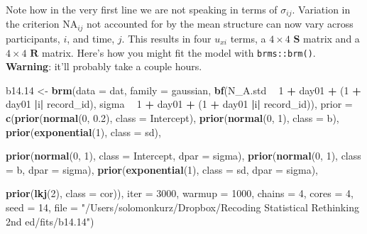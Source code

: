 \documentclass[]{article}
\newenvironment{Shaded}{\begin{snugshade}}{\end{snugshade}}
\newcommand{\DataTypeTok}[1]{\textcolor[rgb]{0.13,0.29,0.53}{#1}}
\newcommand{\DecValTok}[1]{\textcolor[rgb]{0.00,0.00,0.81}{#1}}
\newcommand{\FloatTok}[1]{\textcolor[rgb]{0.00,0.00,0.81}{#1}}
\newcommand{\KeywordTok}[1]{\textcolor[rgb]{0.13,0.29,0.53}{\textbf{#1}}}
\newcommand{\NormalTok}[1]{#1}
\newcommand{\OperatorTok}[1]{\textcolor[rgb]{0.81,0.36,0.00}{\textbf{#1}}}
\newcommand{\StringTok}[1]{\textcolor[rgb]{0.31,0.60,0.02}{#1}}
\begin{document}
Note how in the very first line we are not speaking in terms of
\(\sigma_{ij}\). Variation in the criterion \(\text{NA}_{ij}\) not
accounted for by the mean structure can now vary across participants,
\(i\), and time, \(j\). This results in four \(u_{xi}\) terms, a
\(4 \times 4\) \(\mathbf S\) matrix and a \(4 \times 4\) \(\mathbf R\)
matrix. Here's how you might fit the model with \texttt{brms::brm()}.
\textbf{Warning}: it'll probably take a couple hours.

\begin{Shaded}
\begin{Highlighting}[]
\NormalTok{b14}\FloatTok{.14}\NormalTok{ <-}
\StringTok{  }\KeywordTok{brm}\NormalTok{(}\DataTypeTok{data =}\NormalTok{ dat,}
      \DataTypeTok{family =}\NormalTok{ gaussian,}
      \KeywordTok{bf}\NormalTok{(N_A.std }\OperatorTok{~}\StringTok{ }\DecValTok{1} \OperatorTok{+}\StringTok{ }\NormalTok{day01 }\OperatorTok{+}\StringTok{ }\NormalTok{(}\DecValTok{1} \OperatorTok{+}\StringTok{ }\NormalTok{day01 }\OperatorTok{|}\NormalTok{i}\OperatorTok{|}\StringTok{ }\NormalTok{record_id),}
\NormalTok{         sigma }\OperatorTok{~}\StringTok{ }\DecValTok{1} \OperatorTok{+}\StringTok{ }\NormalTok{day01 }\OperatorTok{+}\StringTok{ }\NormalTok{(}\DecValTok{1} \OperatorTok{+}\StringTok{ }\NormalTok{day01 }\OperatorTok{|}\NormalTok{i}\OperatorTok{|}\StringTok{ }\NormalTok{record_id)),}
      \DataTypeTok{prior =} \KeywordTok{c}\NormalTok{(}\KeywordTok{prior}\NormalTok{(}\KeywordTok{normal}\NormalTok{(}\DecValTok{0}\NormalTok{, }\FloatTok{0.2}\NormalTok{), }\DataTypeTok{class =}\NormalTok{ Intercept),}
                \KeywordTok{prior}\NormalTok{(}\KeywordTok{normal}\NormalTok{(}\DecValTok{0}\NormalTok{, }\DecValTok{1}\NormalTok{), }\DataTypeTok{class =}\NormalTok{ b),}
                \KeywordTok{prior}\NormalTok{(}\KeywordTok{exponential}\NormalTok{(}\DecValTok{1}\NormalTok{), }\DataTypeTok{class =}\NormalTok{ sd),}
                
                \KeywordTok{prior}\NormalTok{(}\KeywordTok{normal}\NormalTok{(}\DecValTok{0}\NormalTok{, }\DecValTok{1}\NormalTok{), }\DataTypeTok{class =}\NormalTok{ Intercept, }\DataTypeTok{dpar =}\NormalTok{ sigma),}
                \KeywordTok{prior}\NormalTok{(}\KeywordTok{normal}\NormalTok{(}\DecValTok{0}\NormalTok{, }\DecValTok{1}\NormalTok{), }\DataTypeTok{class =}\NormalTok{ b, }\DataTypeTok{dpar =}\NormalTok{ sigma),}
                \KeywordTok{prior}\NormalTok{(}\KeywordTok{exponential}\NormalTok{(}\DecValTok{1}\NormalTok{), }\DataTypeTok{class =}\NormalTok{ sd, }\DataTypeTok{dpar =}\NormalTok{ sigma),}
                
                \KeywordTok{prior}\NormalTok{(}\KeywordTok{lkj}\NormalTok{(}\DecValTok{2}\NormalTok{), }\DataTypeTok{class =}\NormalTok{ cor)),}
      \DataTypeTok{iter =} \DecValTok{3000}\NormalTok{, }\DataTypeTok{warmup =} \DecValTok{1000}\NormalTok{, }\DataTypeTok{chains =} \DecValTok{4}\NormalTok{, }\DataTypeTok{cores =} \DecValTok{4}\NormalTok{,}
      \DataTypeTok{seed =} \DecValTok{14}\NormalTok{,}
      \DataTypeTok{file =} \StringTok{"/Users/solomonkurz/Dropbox/Recoding Statistical Rethinking 2nd ed/fits/b14.14"}\NormalTok{)}
\end{Highlighting}
\end{Shaded}
\end{document}
